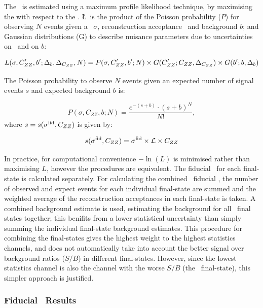 The \cx\ is estimated using a maximum profile likelihood technique, by
maximising the  with respect to the \cx.
\L\ is the product of the Poisson probability ($P$) for observing $N$ events given a
\cx\ $\sigma$, reconstruction acceptance \CZZ\ and background $b$; and Gaussian
distributions (G) to describe nuisance parameters due to uncertainties on \CZZ\
and on $b$:

\begin{equation}
\small
   L(\sigma, C_{ZZ}', b'; \Delta_{b}, \Delta_{C_{ZZ}}, N) = P(\sigma, C_{ZZ}^\prime,
   b^\prime; N)\times G(C_{ZZ}^\prime; C_{ZZ}, \Delta_{C_{ZZ}}) \times G(b^\prime; b, \Delta_{b})
\end{equation}

The Poisson probability to observe $N$ events given an expected
number of signal events $s$ and expected background $b$ is:

\begin{equation}
P(\sigma, C_{ZZ}, b; N) =
\frac{e^{-(s+b)}\cdot
     \left(s+b\right)^{N}}
     {N!},
\end{equation}
where $s=s(\sigma^{\rm fid}, C_{ZZ})$ is given by:

\begin{equation}
   s(\sigma^{\rm fid}, C_{ZZ}) = \sigma^{\rm fid}\times\mathcal{L}\times C_{ZZ} \\
\end{equation}

In practice, for computational convenience $-\ln(L)$ is minimised rather
than maximising $L$, however the procedures are equivalent. The fiducial
\cx\ for each final-state is calculated separately. For calculating the combined \ZZllll\
fiducial \cx, the number of observed and expect events for each individual
final-state are summed and the weighted average of the reconstruction
acceptances in each final-state is taken. A combined background estimate is used,
estimating the background for all \llll\ final states together; this benifits from a
lower statistical uncertainty than simply summing the individual final-state background
estimates. This procedure for combining the final-states gives the highest weight to the highest
statistics channels, and does not automatically take into account the better
signal over background ratios ($S/B$) in different final-states. However, since the
lowest statistics channel is also the channel with the worse $S/B$ (the \eeee\
final-state), this simpler approach is justified.

\subsubsection{Fiducial \CX\ Results}

